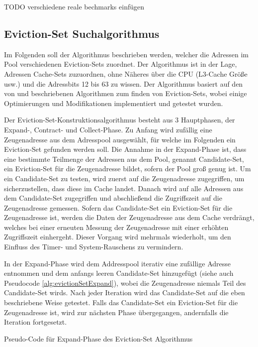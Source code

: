 TODO verschiedene reale bechmarks einfügen 

\subsection{Eviction-Set Suchalgorithmus}

Im Folgenden soll der Algorithmus beschrieben werden, welcher die Adressen im Pool verschiedenen Eviction-Sets zuordnet.
Der Algorithmus ist in der Lage, Adressen Cache-Sets zuzuordnen, ohne Näheres über die CPU (L3-Cache Größe usw.) und die Adressbits 12 bis 63 zu wissen.
Der Algorithmus basiert auf den von \cite{DriveByPaper} und \cite{PrimeAndAbort} beschriebenen Algorithmen zum finden von Eviction-Sets, wobei einige Optimierungen und Modifikationen implementiert und getestet wurden.

Der Eviction-Set-Konstruktionsalgorithmus besteht aus 3 Hauptphasen, der Expand-, Contract- und Collect-Phase. 
Zu Anfang wird zufällig eine Zeugenadresse aus dem Adresspool ausgewählt, für welche im Folgenden ein Eviction-Set gefunden werden soll.
Die Annahme in der Expand-Phase ist, dass eine bestimmte Teilmenge der Adressen aus dem Pool, genannt Candidate-Set, ein Eviction-Set für die Zeugenadresse bildet, sofern der Pool groß genug ist. 
Um ein Candidate-Set zu testen, wird zuerst auf die Zeugenadresse zugegriffen, um sicherzustellen, dass diese im Cache landet.
Danach wird auf alle Adressen aus dem Candidate-Set zugegriffen und abschließend die Zugriffszeit auf die Zeugenadresse gemessen. 
Sofern das Candidate-Set ein Eviction-Set für die Zeugenadresse ist, werden die Daten der Zeugenadresse aus dem Cache verdrängt, welches bei einer erneuten Messung der Zeugenadresse mit einer erhöhten Zugriffszeit einhergeht.
Dieser Vorgang wird mehrmals wiederholt, um den Einfluss des Timer- und System-Rauschens zu vermindern.

In der Expand-Phase wird dem Addresspool iterativ eine zufällige Adresse entnommen und dem anfangs leeren Candidate-Set hinzugefügt (siehe auch Pseudocode \ref{alg:evictionSetExpand}), wobei die Zeugenadresse niemals Teil des Candidate-Set wirds.
Nach jeder Iteration wird das Candidate-Set auf die eben beschriebene Weise getestet.
Falls das Candidate-Set ein Eviction-Set für die Zeugenadresse ist, wird zur nächsten Phase übergegangen, andernfalls die Iteration fortgesetzt.

\begin{algorithm}[h]
\DontPrintSemicolon
\caption{Pseudo-Code für Expand-Phase des Eviction-Set Algorithmus}
\label{alg:evictionSetExpand}

\end{algorithm}

